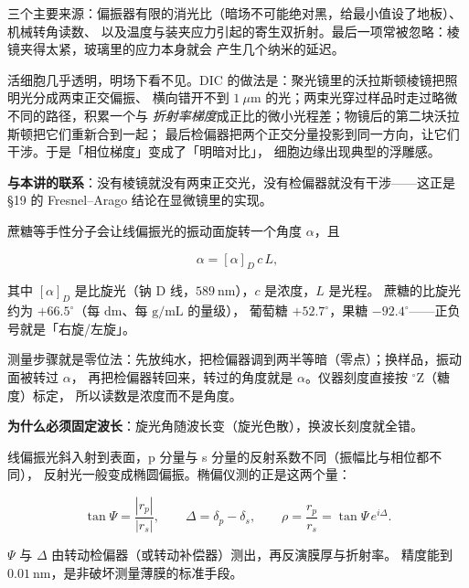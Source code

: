 \documentclass[11pt]{ctexart}
\let\subhdrtheme\subhdr
\renewcommand{\subhdr}[1]{\needspace{3\baselineskip}\subhdrtheme{#1}}
\let\hdrorig\hdr
\renewcommand{\hdr}[2]{\needspace{8\baselineskip}\hdrorig{#1}{#2}}
\begin{document}

三个主要来源：偏振器有限的消光比（暗场不可能绝对黑，给最小值设了地板）、机械转角读数、
以及温度与装夹应力引起的寄生双折射。最后一项常被忽略：棱镜夹得太紧，玻璃里的应力本身就会
产生几个纳米的延迟。



活细胞几乎透明，明场下看不见。DIC 的做法是：聚光镜里的沃拉斯顿棱镜把照明光分成两束正交偏振、
横向错开不到 $1\ \mu\mathrm{m}$ 的光；两束光穿过样品时走过略微不同的路径，积累一个与
\emph{折射率梯度}成正比的微小光程差；物镜后的第二块沃拉斯顿把它们重新合到一起；
最后检偏器把两个正交分量投影到同一方向，让它们干涉。于是「相位梯度」变成了「明暗对比」，
细胞边缘出现典型的浮雕感。

\textbf{与本讲的联系}：没有棱镜就没有两束正交光，没有检偏器就没有干涉——这正是 §19 的
Fresnel--Arago 结论在显微镜里的实现。


蔗糖等手性分子会让线偏振光的振动面旋转一个角度 $\alpha$，且

\[
\alpha=[\alpha]_D\,c\,L ,
\]

其中 $[\alpha]_D$ 是比旋光（钠 D 线，$589\ \mathrm{nm}$），$c$ 是浓度，$L$ 是光程。
蔗糖的比旋光约为 $+66.5^\circ$（每 $\mathrm{dm}$、每 $\mathrm{g/mL}$ 的量级），
葡萄糖 $+52.7^\circ$，果糖 $-92.4^\circ$——正负号就是「右旋/左旋」。

测量步骤就是零位法：先放纯水，把检偏器调到两半等暗（零点）；换样品，振动面被转过 $\alpha$，
再把检偏器转回来，转过的角度就是 $\alpha$。仪器刻度直接按 $^\circ\mathrm{Z}$（糖度）标定，
所以读数是浓度而不是角度。

\textbf{为什么必须固定波长}：旋光角随波长变（旋光色散），换波长刻度就全错。


线偏振光斜入射到表面，p 分量与 s 分量的反射系数不同（振幅比与相位都不同），
反射光一般变成椭圆偏振。椭偏仪测的正是这两个量：

\[
\tan\Psi=\frac{|r_p|}{|r_s|},\qquad \Delta=\delta_p-\delta_s,\qquad
\rho=\frac{r_p}{r_s}=\tan\Psi\,e^{i\Delta}.
\]

$\Psi$ 与 $\Delta$ 由转动检偏器（或转动补偿器）测出，再反演膜厚与折射率。
精度能到 $0.01\ \mathrm{nm}$，是非破坏测量薄膜的标准手段。
\end{document}
